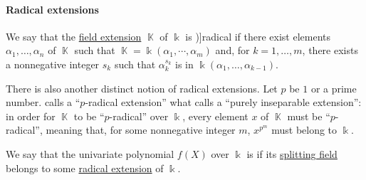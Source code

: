 \paragraph{Radical extensions}

\begin{definition}\label{def:radical_extension}
  We say that the \hyperref[def:field/subobject]{field extension} \( \BbbK \) of \( \Bbbk \) is \term[ru=радикальное (рассширение) (\cite[\S D18.3]{Тыртышников2007ЛинейнаяАлгебра})]{radical} if there exist elements \( \alpha_1, \ldots, \alpha_n \) of \( \BbbK \) such that \( \BbbK = \Bbbk(\alpha_1, \cdots, \alpha_m) \) and, for \( k = 1, \ldots, m \), there exists a nonnegative integer \( s_k \) such that \( \alpha_k^{s_k} \) is in \( \Bbbk(\alpha_1, \ldots, \alpha_{k-1}) \).
\end{definition}
\begin{comments}
  \item There is also another distinct notion of radical extensions. Let \( p \) be \( 1 \) or a prime number. \Textcite[def. V.5.2]{Bourbaki2003Algebra4to7} calls a \enquote{\( p \)-radical extension} what \textcite[exerc. VII.4.14]{Aluffi2009Algebra} calls a \enquote{purely inseparable extension}: in order for \( \BbbK \) to be \enquote{\( p \)-radical} over \( \Bbbk \), every element \( x \) of \( \BbbK \) must be \enquote{\( p \)-radical}, meaning that, for some nonnegative integer \( m \), \( x^{p^m} \) must belong to \( \Bbbk \).
\end{comments}

\begin{definition}\label{def:polynomial_solvable_by_radicals}
  We say that the univariate polynomial \( f(X) \) over \( \Bbbk \) is  if its \hyperref[def:splitting_field]{splitting field} belongs to some \hyperref[def:radical_extension]{radical extension} of \( \Bbbk \).
\end{definition}

